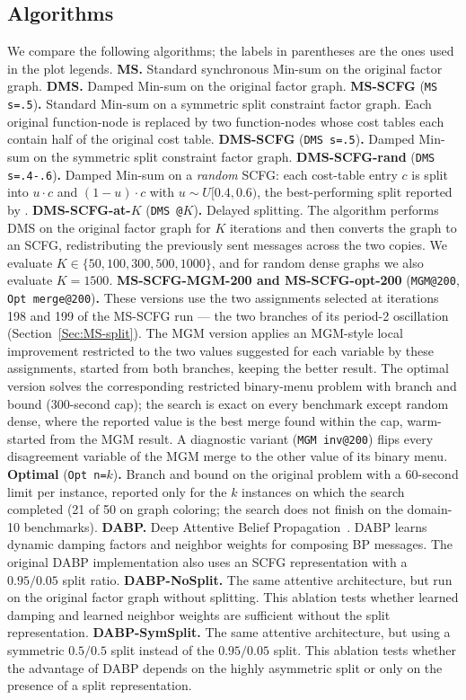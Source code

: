\documentclass[letterpaper]{article} %
\theoremstyle{definition}
\theoremstyle{remark}
\begin{document}
\subsection{Algorithms}
We compare the following algorithms; the labels in parentheses are the ones
used in the plot legends.
\textbf{MS.}  Standard synchronous Min-sum on the original factor graph.
\textbf{DMS.}  Damped Min-sum on the original factor graph.
\textbf{MS-SCFG} (\texttt{MS s=.5})\textbf{.}  Standard Min-sum on a symmetric
split constraint factor graph.  Each original function-node is replaced by two
function-nodes whose cost tables each contain half of the original cost table.
\textbf{DMS-SCFG} (\texttt{DMS s=.5})\textbf{.}  Damped Min-sum on the
symmetric split constraint factor graph.
\textbf{DMS-SCFG-rand} (\texttt{DMS s=.4-.6})\textbf{.}  Damped Min-sum on a
\emph{random} SCFG: each cost-table entry $c$ is split into $u \cdot c$ and
$(1-u) \cdot c$ with $u \sim U[0.4, 0.6)$, the best-performing split reported
by \citet{CohenGZ20}.
\textbf{DMS-SCFG-at-$K$} (\texttt{DMS @$K$})\textbf{.}  Delayed splitting.  The
algorithm performs DMS on the original factor graph for $K$ iterations and then
converts the graph to an SCFG, redistributing the previously sent messages
across the two copies.  We evaluate $K\in\{50,100,300,500,1000\}$, and for
random dense graphs we also evaluate $K=1500$.
\textbf{MS-SCFG-MGM-200 and MS-SCFG-opt-200} (\texttt{MGM@200},
\texttt{Opt merge@200})\textbf{.}  These versions use the two assignments
selected at iterations 198 and 199 of the MS-SCFG run --- the two branches of
its period-2 oscillation (Section~\ref{Sec:MS-split}).  The MGM version applies
an MGM-style local improvement restricted to the two values suggested for each
variable by these assignments, started from both branches, keeping the better
result.  The optimal version solves the corresponding restricted binary-menu
problem with branch and bound (300-second cap); the search is exact on every
benchmark except random dense, where the reported value is the best merge found
within the cap, warm-started from the MGM result.  A diagnostic variant
(\texttt{MGM inv@200}) flips every disagreement variable of the MGM merge to
the other value of its binary menu.
\textbf{Optimal} (\texttt{Opt n=$k$})\textbf{.}  Branch and bound on the
original problem with a 60-second limit per instance, reported only for the $k$
instances on which the search completed (21 of 50 on graph coloring; the search
does not finish on the domain-10 benchmarks).
\textbf{DABP.}  Deep Attentive Belief Propagation~\cite{DengKL022}.  DABP
learns dynamic damping factors and neighbor weights for composing BP messages.
The original DABP implementation also uses an SCFG representation with a
$0.95/0.05$ split ratio.
\textbf{DABP-NoSplit.}  The same attentive architecture, but run on the original
factor graph without splitting.  This ablation tests whether learned damping
and learned neighbor weights are sufficient without the split representation.
\textbf{DABP-SymSplit.}  The same attentive architecture, but using a symmetric
$0.5/0.5$ split instead of the $0.95/0.05$ split.  This ablation tests whether
the advantage of DABP depends on the highly asymmetric split or only on the
presence of a split representation.
\end{document}
